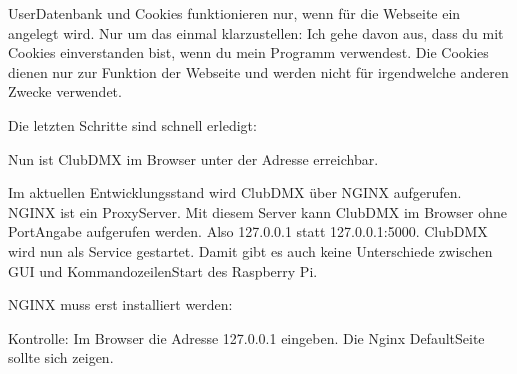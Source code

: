\documentclass[letterpaper,10pt,ngerman]{sphinxmanual}
\begin{document}
User\sphinxhyphen{}Datenbank und Cookies funktionieren nur, wenn für die Webseite ein
 angelegt wird. Nur um das einmal klarzustellen: Ich gehe davon aus,
dass du mit Cookies einverstanden bist, wenn du mein Programm verwendest. Die
Cookies dienen nur zur Funktion der Webseite und werden nicht für irgendwelche
anderen Zwecke verwendet.

\begin{sphinxVerbatim}[commandchars=\\\{\}]
 
 
  
\end{sphinxVerbatim}


Die letzten Schritte sind schnell erledigt:

\begin{sphinxVerbatim}[commandchars=\\\{\}]
 
 
  
 
\end{sphinxVerbatim}

Nun ist ClubDMX im Browser unter der Adresse  erreichbar.


Im aktuellen Entwicklungsstand wird ClubDMX über NGINX aufgerufen.
NGINX ist ein Proxy\sphinxhyphen{}Server. Mit diesem Server kann ClubDMX im Browser ohne
Port\sphinxhyphen{}Angabe aufgerufen werden. Also 127.0.0.1 statt 127.0.0.1:5000.
ClubDMX wird nun als Service gestartet. Damit gibt es auch keine Unterschiede
zwischen GUI und Kommandozeilen\sphinxhyphen{}Start des Raspberry Pi.

NGINX muss erst installiert werden:


Kontrolle: Im Browser die Adresse 127.0.0.1 eingeben.
Die Nginx Default\sphinxhyphen{}Seite sollte sich zeigen.
\end{document}
